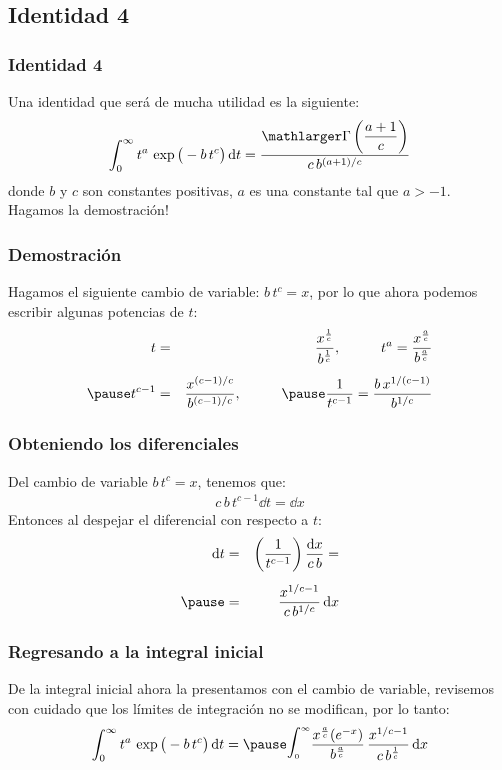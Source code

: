 \documentclass[12pt]{beamer}
\begin{document}
\subsection{Identidad 4}

\begin{frame}
\frametitle{Identidad 4}
Una identidad que será de mucha utilidad es la siguiente:
\begin{align*}
\int_{0}^{\infty} t^{a} \, \exp \big( -b \, t^{c} \big) \dd{t} = \dfrac{\mathlarger\Gamma \left( \dfrac{a + 1}{c} \right) }{c \, b^{(a+1)/c}}
\end{align*}
donde $b$ y $c$ son constantes positivas, $a$ es una constante tal que $a > -1$.
\\
\bigskip
\pause
Hagamos la demostración!
\end{frame}
\begin{frame}
\frametitle{Demostración}
Hagamos el siguiente cambio de variable: $b \, t^{c} = x$, por lo que ahora podemos escribir algunas potencias de $t$:
\begin{eqnarray*}
t &=& \dfrac{x^{\frac{1}{c}}}{b^{\frac{1}{c}}}, \hspace{1cm} t^{a} = \dfrac{x^{\frac{a}{c}}}{b^{\frac{a}{c}}} \\[0.5em] \pause
t^{c-1} &=& \dfrac{x^{(c-1)/c}}{b^{(c-1)/c}}, \hspace{1cm} \pause \dfrac{1}{t^{c-1}} = \dfrac{b \, x^{1/(c-1)}}{b^{1/c}}
\end{eqnarray*}
\end{frame}
\begin{frame}
\frametitle{Obteniendo los diferenciales}
Del cambio de variable $b \, t^{c} = x$, tenemos que:
\begin{align*}
c \, b \, t^{c-1} \dd{t} = \dd{x}
\end{align*}
\pause
Entonces al despejar el diferencial con respecto a $t$:
\begin{eqnarray*}
\dd{t} &=& \left( \dfrac{1}{t^{c-1}} \right) \dfrac{\dd{x}}{c \, b} = \\[0.5em] \pause
&=& \dfrac{x^{1/c-1}}{c \, b^{1/c}} \dd{x}
\end{eqnarray*}
\end{frame}
\begin{frame}
\frametitle{Regresando a la integral inicial}
De la integral inicial ahora la presentamos con el cambio de variable, revisemos con cuidado que los límites de integración no se modifican, por lo tanto:
\begin{eqnarray*}
\int_{0}^{\infty} t^{a} \, \exp \big( -b \, t^{c} \big) \dd{t} = \pause  \displaystyle \scalerel{\int_{\text{\tiny{0}}}^{\text{\tiny{$\infty$}}}}{\dfrac{x^{\frac{a}{c}} (e^{-x})}{b^{\frac{a}{c}}}} \, \dfrac{x^{1/c - 1}}{c \, b^{\frac{1}{c}}} \dd{x}
\end{eqnarray*}
\end{frame}
\end{document}
